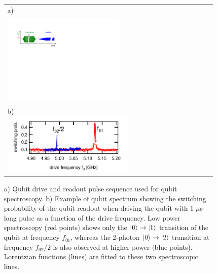 \begin{figure}
\begin{tabular}{l}
a) \\ \includegraphics[width=0.55\textwidth]{"./material/figures/measurement/qubit_spectroscopy"} \\
b) \\ \includegraphics[width=0.6\textwidth]{"./data/ct5/2011_04_21 - grover and tomo/example - qubit 2 spectroscopy"} \\
\end{tabular}
\caption[]{a) Qubit drive and readout pulse sequence used for qubit spectroscopy. b) Example of qubit spectrum showing the switching probability of the qubit readout when driving the qubit with 1 $\mu$s-long pulse as a function of the drive frequency. Low power spectroscopy (red points) shows only the $\left| 0 \right>\to\left| 1 \right>$ transition of the qubit at frequency $f_{01}$, whereas the 2-photon $\left| 0 \right>\to\left| 2 \right>$ transition at frequency $f_{02}/2$ is also observed at higher power (blue points). Lorentzian functions (lines) are fitted to these two spectroscopic lines.}
\label{fig:qubit_spectroscopy_example}
\end{figure}

